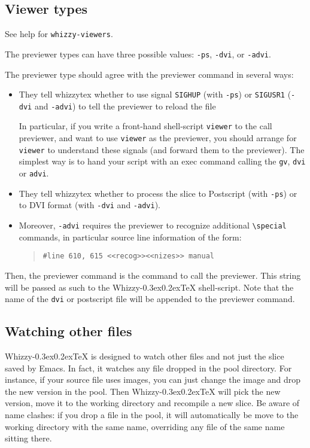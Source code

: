 \documentclass[12pt]{article}
\makeatletter
\let \lst \verb
\def \whizzy {{Whizzy\kern -0.3ex\raise 0.2ex\hbox{\let \@\relax\TeX}}}
\makeatother
\begin{document}
\subsection {Viewer types}
\label {types}

See help for \lst"whizzy-viewers".

The previewer types can have three possible values:
{\tt -ps}, {\tt -dvi}, or {\tt -advi}. 

The previewer type should agree with the previewer command in several ways:
\begin {itemize}

\item
They tell whizzytex whether to use signal {\tt SIGHUP} (with {\tt -ps})
or {\tt SIGUSR1}  ({\tt -dvi} and {\tt -advi}) to tell the previewer to
reload the file

In particular, if you write a front-hand shell-script \lst"viewer" to the
call previewer,  and want to use \lst"viewer" as the previewer, you should 
arrange for \lst"viewer" to understand these signals (and forward them to the
previewer). The simplest way is to hand your script with an exec command
calling the \lst"gv", \lst"dvi" or \lst"advi".



\item
They tell whizzytex whether to process the slice to 
Postscript (with {\tt -ps}) or to DVI format (with {\tt -dvi} and {\tt -advi}). 

\item
Moreover, {\tt -advi} requires the previewer to 
recognize additional \lst"\special" commands, in particular
source line information of the form: 
\begin{quote}
\begin{verbatim}
#line 610, 615 <<recog>><<nizes>> manual
\end{verbatim}
\end{quote}

\end {itemize}
Then, the previewer command is the command to call the previewer.  This
string will be passed as such to the {\whizzy} shell-script. Note that the
name of the \lst"dvi" or postscript file will be appended to the previewer
command.


\subsection {Watching other files}

{\whizzy} is designed to watch other files and not just the slice saved by
Emacs. In fact, it watches any file dropped in the pool directory. 
For instance, 
if your source file uses images, you can just change the image and
drop the new version in the pool. Then {\whizzy} will pick the new version,
move it to the working directory and recompile a new slice. Be aware of name
clashes: if you drop a file in the pool, it will automatically be move to
the working directory with the same name, overriding any file of the same
name sitting there. 
\end{document}
